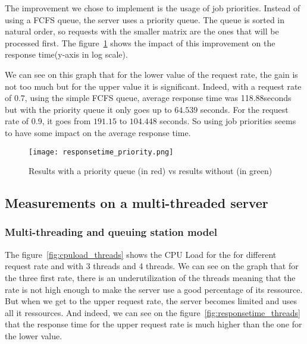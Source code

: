 The improvement we chose to implement is the usage of job priorities. Instead of using a FCFS queue, the server uses a priority queue. The queue is sorted in natural order, so requests with the smaller matrix are the ones that will be processed first. The figure~\ref{fig:priorityqueue} shows the impact of this
improvement on the response time(y-axis in log scale). \newline

We can see on this graph that for the lower value of the request rate, the gain is not too much but for the upper value it is significant. Indeed, with a request rate of $0.7$, using the simple FCFS queue, average response time was 118.88seconds but with the priority queue it only goes up to $64.539$ seconds. For the request rate of $0.9$, it goes from $191.15$ to $104.448$ seconds. So using job priorities seems to have some impact on the average response time.

\begin{figure}[!ht]
    \centering
    \texttt{[image: responsetime\_priority.png]}
    \caption{Results with a priority queue (in red) vs results without (in green)}
    \label{fig:priorityqueue}
\end{figure}

\subsection{Measurements on a multi-threaded server}
\label{sub:Measurements on a multi-threaded server}



\subsubsection{Multi-threading and queuing station model}
\label{subs:Multi-threading and queuing station model}

The figure~\ref{fig:cpuload_threads} shows the CPU Load for the for different request rate and with 3 threads and 4 threads. We can see on the graph that for the three first rate, there is an underutilization of the threads meaning that the rate is not high enough to make the server use a good percentage of its ressource. But when we get to the upper request rate, the server becomes
limited and uses all it ressources. And indeed, we can see on the figure~\ref{fig:responsetime_threads} that the response time for the upper request rate is much higher than the one for the lower value.

